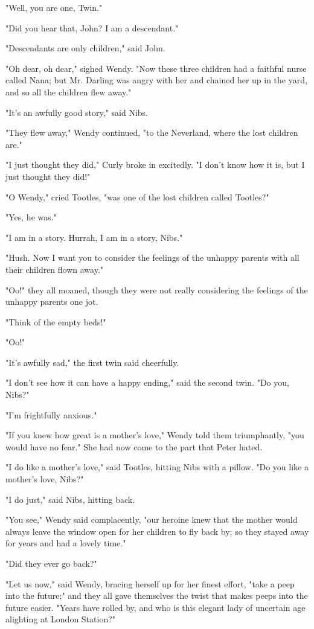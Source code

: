 "Well, you are one, Twin."


"Did you hear that, John? I am a descendant."


"Descendants are only children," said John.


"Oh dear, oh dear," sighed Wendy. "Now these three children had a faithful
nurse called Nana; but Mr. Darling was angry with her and chained her up
in the yard, and so all the children flew away."


"It's an awfully good story," said Nibs.


"They flew away," Wendy continued, "to the Neverland, where the lost
children are."


"I just thought they did," Curly broke in excitedly. "I don't know how it
is, but I just thought they did!"


"O Wendy," cried Tootles, "was one of the lost children called Tootles?"


"Yes, he was."


"I am in a story. Hurrah, I am in a story, Nibs."


"Hush. Now I want you to consider the feelings of the unhappy parents with
all their children flown away."


"Oo!" they all moaned, though they were not really considering the
feelings of the unhappy parents one jot.


"Think of the empty beds!"


"Oo!"


"It's awfully sad," the first twin said cheerfully.


"I don't see how it can have a happy ending," said the second twin. "Do
you, Nibs?"


"I'm frightfully anxious."


"If you knew how great is a mother's love," Wendy told them triumphantly,
"you would have no fear." She had now come to the part that Peter hated.


"I do like a mother's love," said Tootles, hitting Nibs with a pillow. "Do
you like a mother's love, Nibs?"


"I do just," said Nibs, hitting back.


"You see," Wendy said complacently, "our heroine knew that the mother
would always leave the window open for her children to fly back by; so
they stayed away for years and had a lovely time."


"Did they ever go back?"


"Let us now," said Wendy, bracing herself up for her finest effort, "take
a peep into the future;" and they all gave themselves the twist that makes
peeps into the future easier. "Years have rolled by, and who is this
elegant lady of uncertain age alighting at London Station?"


